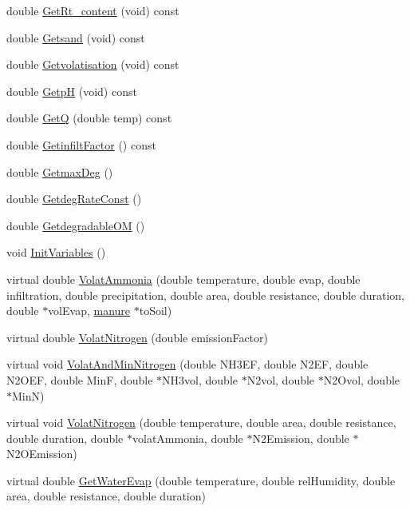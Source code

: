 \begin{DoxyCompactItemize}
\item 
double \hyperlink{classmanure_af02a1de2138e4c9e2aa182a2891e5182}{GetRt\_\-content} (void) const 
\item 
double \hyperlink{classmanure_aae99257f7fb59e92b218339362b9cb4b}{Getsand} (void) const 
\item 
double \hyperlink{classmanure_a2e85d960cb09d2a21943c7968402f23a}{Getvolatisation} (void) const 
\item 
double \hyperlink{classmanure_aeb6b9f64e829c8f799cd771c6090cdcf}{GetpH} (void) const 
\item 
double \hyperlink{classmanure_a7b77b90caee4bc5fcf2dea610ffdd321}{GetQ} (double temp) const 
\item 
double \hyperlink{classmanure_a9ef6ec705107f1162883332a05f5cd87}{GetinfiltFactor} () const 
\item 
double \hyperlink{classmanure_aa608bf6f9be6d1d02c6788dfb8a6eadf}{GetmaxDeg} ()
\item 
double \hyperlink{classmanure_a17370a1b9fb3505d4dfd2d33430bd7e6}{GetdegRateConst} ()
\item 
double \hyperlink{classmanure_ade6dc43e945016f901ced6a54527ea80}{GetdegradableOM} ()
\item 
void \hyperlink{classmanure_ac45a5d29b499ebe4f93a8473dc2cf821}{InitVariables} ()
\item 
virtual double \hyperlink{classmanure_ad759c54bfd7b7656f5601b39efee16a4}{VolatAmmonia} (double temperature, double evap, double infiltration, double precipitation, double area, double resistance, double duration, double $\ast$volEvap, \hyperlink{classmanure}{manure} $\ast$toSoil)
\item 
virtual double \hyperlink{classmanure_ab9836c0cde19119bae96ee2602c75f95}{VolatNitrogen} (double emissionFactor)
\item 
virtual void \hyperlink{classmanure_abf7e3e8410ff6ec04010568c204f9ca6}{VolatAndMinNitrogen} (double NH3EF, double N2EF, double N2OEF, double MinF, double $\ast$NH3vol, double $\ast$N2vol, double $\ast$N2Ovol, double $\ast$MinN)
\item 
virtual void \hyperlink{classmanure_a28d72550be1b4392ebabfdbbb8c36e39}{VolatNitrogen} (double temperature, double area, double resistance, double duration, double $\ast$volatAmmonia, double $\ast$N2Emission, double $\ast$N2OEmission)
\item 
virtual double \hyperlink{classmanure_a6aba3f146ff412c234583f5f1c805000}{GetWaterEvap} (double temperature, double relHumidity, double area, double resistance, double duration)

\end{DoxyCompactItemize}
